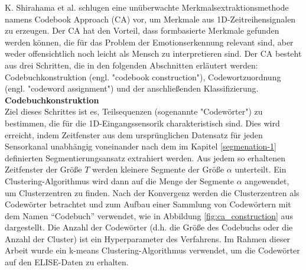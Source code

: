 K. Shirahama et al. \cite{kimiaki_codebook_approach_2016} schlugen eine unüberwachte Merkmalsextraktionsmethode namens Codebook Approach (CA) vor, um Merkmale aus 1D-Zeitreihensignalen zu erzeugen.
Der CA hat den Vorteil, dass formbasierte Merkmale gefunden werden können, die für das Problem der Emotionserkennung relevant sind, aber weder offensichtlich noch leicht als Mensch zu interpretieren sind. 
Der CA besteht aus drei Schritten, die in den folgenden Abschnitten erläutert werden: Codebuchkonstruktion (engl. "codebook construction"), Codewortzuordnung (engl. "codeword assignment") und der anschließenden Klassifizierung. \\


\textbf{Codebuchkonstruktion \\}
Ziel dieses Schrittes ist es, Teilsequenzen (sogenannte "Codewörter") zu bestimmen, die für die 1D-Eingangssensorik charakteristisch sind. 
Dies wird erreicht, indem Zeitfenster aus dem ursprünglichen Datensatz für jeden Sensorkanal unabhängig voneinander nach dem im Kapitel \ref{segmenation-1} definierten Segmentierungsansatz extrahiert werden.
Aus jedem so erhaltenen Zeitfenster der Größe $T$ werden kleinere Segmente der Größe $\alpha$ unterteilt.
Ein Clustering-Algorithmus wird dann auf die Menge der Segmente $\alpha$ angewendet, um Clusterzentren zu finden.
Nach der Konvergenz werden die Clusterzentren als Codewörter betrachtet und zum Aufbau einer Sammlung von Codewörtern mit dem Namen ``Codebuch'' verwendet, wie in Abbildung \ref{fig:ca_construction} aus \cite{kimiaki_codebook_approach_2016} dargestellt. 
Die Anzahl der Codewörter (d.h. die Größe des Codebuchs oder die Anzahl der Cluster) ist ein Hyperparameter des Verfahrens. Im Rahmen dieser Arbeit wurde ein k-means Clustering-Algorithmus verwendet, um die Codewörter auf den ELISE-Daten zu erhalten. \\

